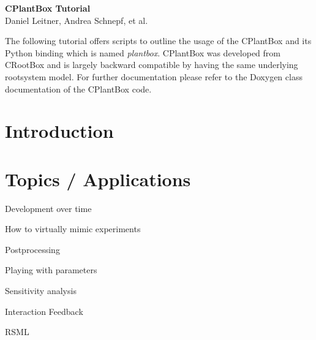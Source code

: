 \documentclass[a4paper]{article}
\begin{document}
\begin{center}
\vspace{0.5 cm}
\huge{\textbf{CPlantBox Tutorial}} \\
\vspace{0.5 cm}
\normalsize
Daniel Leitner, Andrea Schnepf, et al. \\
\end{center}

\vspace{0.5 cm}

\noindent 
The following tutorial offers scripts to outline the usage of the CPlantBox \citep{zhou2020cplantbox} and its Python binding which is named \emph{plantbox}. CPlantBox was developed from CRootBox \citep{schnepf2018crootbox} and is largely backward compatible by having the same underlying rootsystem model. For further documentation please refer to the Doxygen class documentation of the CPlantBox code.
 

\vspace{0.5 cm}

\tableofcontents

\newpage

\section{Introduction} \label{sec:introduction}


% 
\section{Topics / Applications} \label{sec:appliations}

Development over time

How to virtually mimic experiments

Postprocessing

Playing with parameters

Sensitivity analysis

Interaction Feedback

RSML

% 
% 
% 
% 
% 
\end{document}
